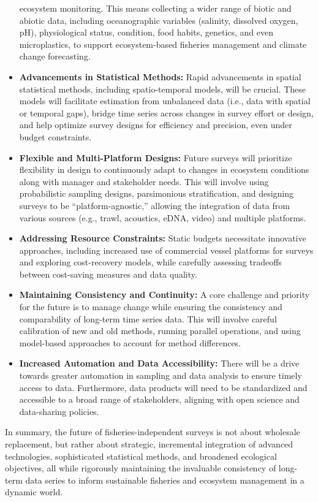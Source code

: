 \documentclass[
  letterpaper,
  oneside,
  open=any]{scrbook}
\begin{document}
\begin{itemize}
  ecosystem monitoring. This means collecting a wider range of biotic
  and abiotic data, including oceanographic variables (salinity,
  dissolved oxygen, pH), physiological status, condition, food habits,
  genetics, and even microplastics, to support ecosystem-based fisheries
  management and climate change forecasting.
\item
  \textbf{Advancements in Statistical Methods:} Rapid advancements in
  spatial statistical methods, including spatio-temporal models, will be
  crucial. These models will facilitate estimation from unbalanced data
  (i.e., data with spatial or temporal gaps), bridge time series across
  changes in survey effort or design, and help optimize survey designs
  for efficiency and precision, even under budget constraints.
\item
  \textbf{Flexible and Multi-Platform Designs:} Future surveys will
  prioritize flexibility in design to continuously adapt to changes in
  ecosystem conditions along with manager and stakeholder needs. This
  will involve using probabilistic sampling designs, parsimonious
  stratification, and designing surveys to be ``platform-agnostic,''
  allowing the integration of data from various sources (e.g., trawl,
  acoustics, eDNA, video) and multiple platforms.
\item
  \textbf{Addressing Resource Constraints:} Static budgets necessitate
  innovative approaches, including increased use of commercial vessel
  platforms for surveys and exploring cost-recovery models, while
  carefully assessing tradeoffs between cost-saving measures and data
  quality.
\item
  \textbf{Maintaining Consistency and Continuity:} A core challenge and
  priority for the future is to manage change while ensuring the
  consistency and comparability of long-term time series data. This will
  involve careful calibration of new and old methods, running parallel
  operations, and using model-based approaches to account for method
  differences.
\item
  \textbf{Increased Automation and Data Accessibility:} There will be a
  drive towards greater automation in sampling and data analysis to
  ensure timely access to data. Furthermore, data products will need to
  be standardized and accessible to a broad range of stakeholders,
  aligning with open science and data-sharing policies.
\end{itemize}

In summary, the future of fisheries-independent surveys is not about
wholesale replacement, but rather about strategic, incremental
integration of advanced technologies, sophisticated statistical methods,
and broadened ecological objectives, all while rigorously maintaining
the invaluable consistency of long-term data series to inform
sustainable fisheries and ecosystem management in a dynamic world.
\end{document}
